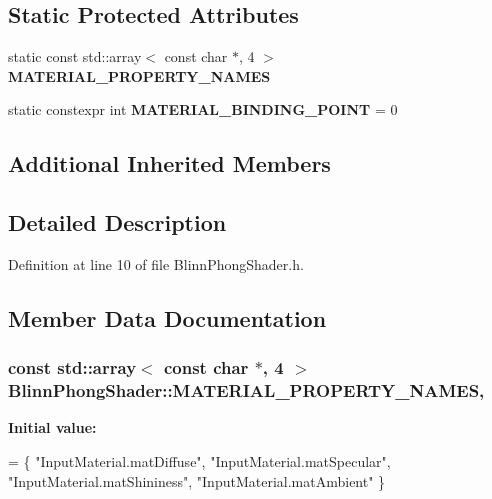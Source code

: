 \subsection*{Static Protected Attributes}
\begin{DoxyCompactItemize}
\item 
static const std\+::array$<$ const char $\ast$, 4 $>$ {\bfseries M\+A\+T\+E\+R\+I\+A\+L\+\_\+\+P\+R\+O\+P\+E\+R\+T\+Y\+\_\+\+N\+A\+M\+E\+S}
\item 
\hypertarget{class_blinn_phong_shader_a8c2a0ab9a26c0369ae3b45d5c9bd8f6b}{}static constexpr int {\bfseries M\+A\+T\+E\+R\+I\+A\+L\+\_\+\+B\+I\+N\+D\+I\+N\+G\+\_\+\+P\+O\+I\+N\+T} = 0\label{class_blinn_phong_shader_a8c2a0ab9a26c0369ae3b45d5c9bd8f6b}

\end{DoxyCompactItemize}
\subsection*{Additional Inherited Members}


\subsection{Detailed Description}


Definition at line 10 of file Blinn\+Phong\+Shader.\+h.



\subsection{Member Data Documentation}
\hypertarget{class_blinn_phong_shader_a3c74161a2680b16786f2c97f04e4ee20}{}
\subsubsection[{M\+A\+T\+E\+R\+I\+A\+L\+\_\+\+P\+R\+O\+P\+E\+R\+T\+Y\+\_\+\+N\+A\+M\+E\+S}]{\setlength{\rightskip}{0pt plus 5cm}const std\+::array$<$ const char $\ast$, 4 $>$ Blinn\+Phong\+Shader\+::\+M\+A\+T\+E\+R\+I\+A\+L\+\_\+\+P\+R\+O\+P\+E\+R\+T\+Y\+\_\+\+N\+A\+M\+E\+S\hspace{0.3cm}{\ttfamily [static]}, {\ttfamily [protected]}}\label{class_blinn_phong_shader_a3c74161a2680b16786f2c97f04e4ee20}
{\bfseries Initial value\+:}
\begin{DoxyCode}
= \{
    \textcolor{stringliteral}{"InputMaterial.matDiffuse"}, 
    \textcolor{stringliteral}{"InputMaterial.matSpecular"}, 
    \textcolor{stringliteral}{"InputMaterial.matShininess"}, 
    \textcolor{stringliteral}{"InputMaterial.matAmbient"}
\}
\end{DoxyCode}


